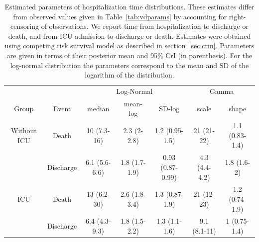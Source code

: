 \begin{table}
    \centering
    \begin{tabular}{ccccccc}
\toprule
 & & \multicolumn{3}{c}{Log-Normal} & \multicolumn{2}{c}{Gamma}\\ \cmidrule(rl){3-5} \cmidrule(rl){6-7}
Group & Event & median & mean-log & SD-log & scale & shape\\
\midrule
Without ICU & Death & 10 (7.3-16) & 2.3 (2-2.8) & 1.2 (0.95-1.5) & 21 (21-22) & 1.1 (0.83-1.4)\\
 & Discharge & 6.1 (5.6-6.6) & 1.8 (1.7-1.9) & 0.93 (0.87-0.99) & 4.3 (4.4-4.2) & 1.8 (1.6-2)\\ \addlinespace
ICU & Death & 13 (6.2-30) & 2.6 (1.8-3.4) & 1.3 (0.87-1.9) & 21 (12-23) & 1.2 (0.74-1.9)\\
 & Discharge & 6.4 (4.3-9.3) & 1.8 (1.5-2.2) & 1.3 (1.1-1.6) & 9.1 (8.1-11) & 1 (0.75-1.4)\\
\bottomrule
\end{tabular}
\caption{Estimated parameters of hospitalization time distributions. These estimates differ from observed values given in Table~\ref{tab:vdparams} by accounting for right-censoring of observations. We report time from hospitalization to discharge or death, and from ICU admission to discharge or death. Estimates were obtained using competing risk survival model as described in section~\ref{sec:crm}. Parameters are given in terms of their posterior mean and 95\% CrI (in parenthesis). For the log-normal distribution the parameters correspond to the mean and SD of the logarithm of the distribution.}
     \label{tab:survpars}
\end{table}

